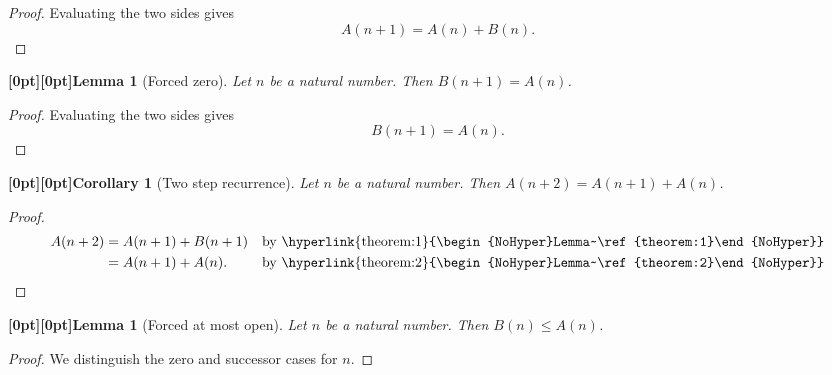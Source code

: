 \documentclass{article}
\makeatletter
\newcommand{\paperanchor}[1]{\hypertarget{#1}{}}%
\newcommand{\paperlink}[2]{\hyperlink{#1}{\begin{NoHyper}#2\end{NoHyper}}}%
\def\paperdest{\pdfextension dest}\def\paperstart{\pdfextension startlink}%
\def\paperend{\pdfextension endlink}\def\papercolor{\pdfextension colorstack}%
\let\paperdest\pdfdest\let\paperstart\pdfstartlink\let\paperend\pdfendlink\let\papercolor\pdfcolorstack
\newcommand{\paperanchor}[1]{\paperdest name{#1} xyz}%
\newcommand{\paperlink}[2]{\leavevmode\paperstart attr{/Border [0 0 0]} goto name{#1}%
      \papercolor 0 push {0.10 0.25 0.42 rg 0.10 0.25 0.42 RG}#2\papercolor 0 pop\paperend}%
\newcommand{\paperanchor}[1]{\special{pdf:dest (#1) [@thispage /XYZ null @ypos null]}}%
\newcommand{\paperlink}[2]{\leavevmode\special{pdf:bann << /Subtype /Link /Border [0 0 0] /A << /S /GoTo /D (#1) >> >>}%
      \special{color push rgb 0.10 0.25 0.42}#2\special{color pop}\special{pdf:eann}}%
\newcommand{\paperlineanchor}[1]{\raisebox{10pt}[0pt][0pt]{\paperanchor{#1}}}
\DeclareRobustCommand{\paperresultname}[1]{\paperlineanchor{theorem:\arabic{theorem}}#1}
\theoremstyle{paperresult}
\newtheorem{lemma}[theorem]{\paperresultname{Lemma}}
\newtheorem{corollary}[theorem]{\paperresultname{Corollary}}
\makeatother
\begin{document}
\begin{proof}
Evaluating the two sides gives
\[
A(n + 1) = A(n) + B(n).
\]
\end{proof}

\begin{lemma}[{Forced zero}]\label{theorem:2}
Let \(n\) be a natural number. Then \(B(n + 1) = A(n)\).
\end{lemma}

\begin{proof}
Evaluating the two sides gives
\[
B(n + 1) = A(n).
\]
\end{proof}

\begin{corollary}[{Two step recurrence}]\label{theorem:3}
Let \(n\) be a natural number. Then \(A(n + 2) = A(n + 1) + A(n)\).
\end{corollary}

\begin{proof}
\begin{align*}
A(n + 2) &= A(n + 1) + B(n + 1) && \text{by \paperlink{theorem:1}{Lemma~\ref{theorem:1}}} \\
 &= A(n + 1) + A(n). && \text{by \paperlink{theorem:2}{Lemma~\ref{theorem:2}}}
\end{align*}
\end{proof}

\begin{lemma}[{Forced at most open}]\label{theorem:4}
Let \(n\) be a natural number. Then \(B(n) \le A(n)\).
\end{lemma}

\begin{proof}
We distinguish the zero and successor cases for \(n\).
\end{proof}
\end{document}
